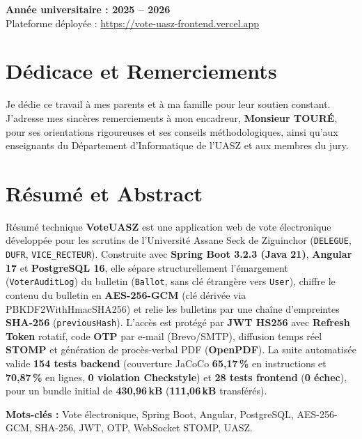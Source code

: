 \documentclass[11pt,a4paper]{report}
\begin{document}
\begin{titlepage}
\begin{center}
    \vfill
    {\normalsize \textbf{\textcolor{uaszdark}{Année universitaire : 2025 -- 2026}}}\\
    {\footnotesize Plateforme déployée : \url{https://vote-uasz-frontend.vercel.app}}
\end{center}
\end{titlepage}


\chapter*{Dédicace et Remerciements}
Je dédie ce travail à mes parents et à ma famille pour leur soutien constant.  
J'adresse mes sincères remerciements à mon encadreur, \textbf{Monsieur TOURÉ}, pour ses orientations rigoureuses et ses conseils méthodologiques, ainsi qu'aux enseignants du Département d'Informatique de l'UASZ et aux membres du jury.

\chapter*{Résumé et Abstract}
\begin{uaszbox}{Résumé technique}
\textbf{VoteUASZ} est une application web de vote électronique développée pour les scrutins de l'Université Assane Seck de Ziguinchor (\texttt{DELEGUE}, \texttt{DUFR}, \texttt{VICE\_RECTEUR}). Construite avec \textbf{Spring Boot 3.2.3 (Java 21)}, \textbf{Angular 17} et \textbf{PostgreSQL 16}, elle sépare structurellement l'émargement (\texttt{VoterAuditLog}) du bulletin (\texttt{Ballot}, sans clé étrangère vers \texttt{User}), chiffre le contenu du bulletin en \textbf{AES-256-GCM} (clé dérivée via PBKDF2WithHmacSHA256) et relie les bulletins par une chaîne d'empreintes \textbf{SHA-256} (\texttt{previousHash}). L'accès est protégé par \textbf{JWT HS256} avec \textbf{Refresh Token} rotatif, code \textbf{OTP} par e-mail (Brevo/SMTP), diffusion temps réel \textbf{STOMP} et génération de procès-verbal PDF (\textbf{OpenPDF}). La suite automatisée valide \textbf{154 tests backend} (couverture JaCoCo \textbf{65,17\,\%} en instructions et \textbf{70,87\,\%} en lignes, \textbf{0 violation Checkstyle}) et \textbf{28 tests frontend} (\textbf{0 échec}), pour un bundle initial de \textbf{430,96\,kB} (\textbf{111,06\,kB} transférés).

\medskip
\noindent\textbf{Mots-clés :} Vote électronique, Spring Boot, Angular, PostgreSQL, AES-256-GCM, SHA-256, JWT, OTP, WebSocket STOMP, UASZ.
\end{uaszbox}
\end{document}
